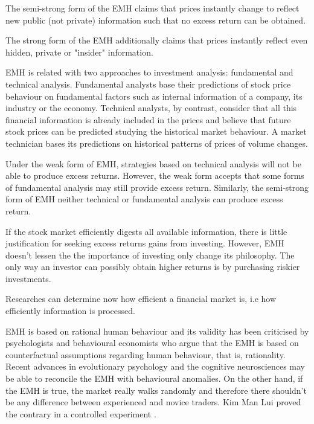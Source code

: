 The semi-strong form of the EMH claims that prices instantly change to reflect new public (not private) information such that no excess return can be obtained. 

The strong form of the EMH additionally claims that prices instantly reflect even hidden, private or "insider" information. 

EMH is related with two approaches to investment analysis: fundamental and technical analysis. Fundamental analysts base their predictions of stock price behaviour on fundamental factors such as internal information of a company, its industry or the economy. Technical analysts, by contrast, consider that all this financial information is already included in the prices and believe that future stock prices can be predicted studying the historical market behaviour. A market technician bases its predictions on historical patterns of prices of volume changes.

Under the weak form of EMH, strategies based on technical analysis will not be able to produce excess returns. However, the weak form accepts that some forms of fundamental analysis may still provide excess return. Similarly, the semi-strong form of EMH  neither technical or fundamental analysis can produce excess return.

If the stock market efficiently digests all available information, there is little justification for seeking excess returns gains from investing. However, EMH doesn't lessen the the importance of investing only change its philosophy. The only way an investor can possibly obtain higher returns is by purchasing riskier investments.

 Researches can determine now how efficient a financial market is, i.e how efficiently information is processed.  

EMH is based on rational human behaviour and its validity has been criticised by
psychologists and behavioural economists who argue that the EMH is based
on counterfactual assumptions regarding human behaviour, that is,
rationality. Recent advances in evolutionary psychology and the cognitive
neurosciences may be able to reconcile the EMH with behavioural
anomalies. On the other hand, if the EMH is true, the market really walks randomly and therefore there shouldn't be any difference between experienced and novice traders. Kim Man Lui proved the contrary in a controlled experiment \cite{man2013}.

